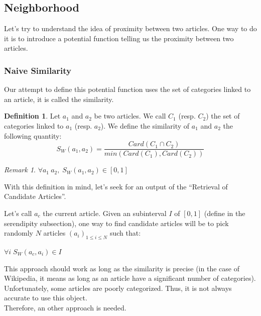\documentclass[11pt]{article}
\theoremstyle{plain}
\theoremstyle{definition}
\newtheorem{defn}{Definition}[section]
\theoremstyle{remark}
\newtheorem*{rem}{Remark}
\begin{document}
\subsection{Neighborhood}

Let's try to understand the idea of proximity between two articles. One way to do it is to introduce a potential function telling us the proximity between two articles.

\subsubsection{Naive Similarity}

Our attempt to define this potential function uses the set of categories linked to an article, it is called the similarity.





\vspace*{5mm}
\begin{defn}
  Let $a_1$ and $a_2$ be two articles. We call $C_1$ (resp. $C_2$) the set of categories linked to $a_1$ (resp. $a_2$).
  We define the similarity of $a_1$ and $a_2$ the following quantity:\\
  \begin{equation*}
    S_W(a_1,a_2) = \frac{Card(C_1 \cap C_2)}{min(Card(C_1),Card(C_2))}
  \end{equation*}
\end{defn}

\begin{rem}
  $\forall a_1\: a_2,\; S_W(a_1,a_2) \in [0,1]$
\end{rem}

\vspace*{5mm}
With this definition in mind, let's seek for an output of the ``Retrieval of Candidate Articles''.


Let's call $a_c$ the current article.
Given an subinterval $I$ of $[0,1]$ (define in the serendipity subsection), one way to find candidate articles will be to pick randomly $N$ articles $(a_i)_{1 \leq i \leq N}$ such that:
\begin{center}
  $\forall i \; S_W(a_c,a_i) \in I$
\end{center}

\vspace*{5mm}
This approach should work as long as the similarity is precise (in the case of Wikipedia, it means as long as an article have a significant number of categories). Unfortunately, some articles are poorly categorized. Thus, it is not always accurate to use this object.\\
Therefore, an other approach is needed.
\end{document}
